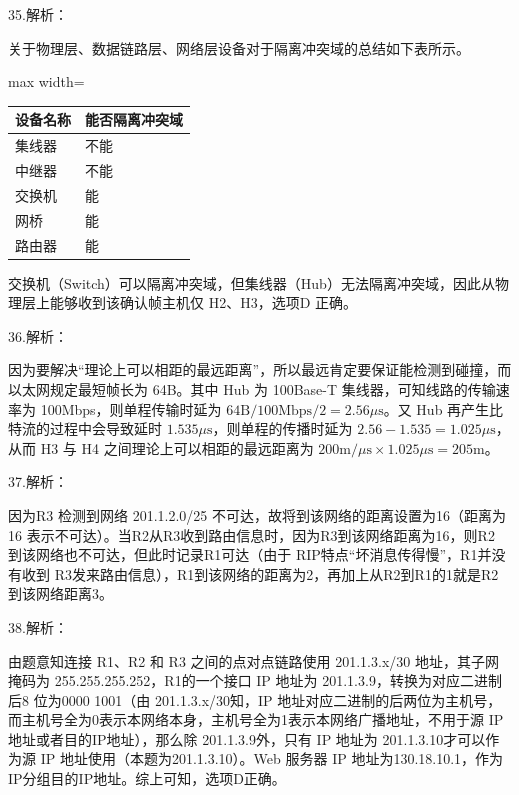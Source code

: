 \documentclass[UTF8,11pt]{ctexart}
\begin{document}
35.解析：


关于物理层、数据链路层、网络层设备对于隔离冲突域的总结如下表所示。


\begin{center}\begin{adjustbox}{max width=\linewidth}\begin{tabular}{|>{\raggedright\arraybackslash}p{\dimexpr(\linewidth-4\tabcolsep-3\arrayrulewidth)/2\relax}|>{\raggedright\arraybackslash}p{\dimexpr(\linewidth-4\tabcolsep-3\arrayrulewidth)/2\relax}|}\hline
设备名称 & 能否隔离冲突域\\\hline
集线器 & 不能\\\hline
中继器 & 不能\\\hline
交换机 & 能\\\hline
网桥 & 能\\\hline
路由器 & 能\\\hline\end{tabular}\end{adjustbox}\end{center}

交换机（Switch）可以隔离冲突域，但集线器（Hub）无法隔离冲突域，因此从物理层上能够收到该确认帧主机仅 H2、H3，选项D 正确。


36.解析：


因为要解决“理论上可以相距的最远距离”，所以最远肯定要保证能检测到碰撞，而以太网规定最短帧长为 64B。其中 Hub 为 100Base-T 集线器，可知线路的传输速率为 100Mbps，则单程传输时延为 \(\displaystyle 64\mathrm{B}/100\mathrm{Mbps}/2=2.56\mu\mathrm{s}\)。又 Hub 再产生比特流的过程中会导致延时 \(\displaystyle 1.535\mu\mathrm{s}\)，则单程的传播时延为 \(\displaystyle 2.56-1.535=1.025\mu\mathrm{s}\)，从而 H3 与 H4 之间理论上可以相距的最远距离为 \(\displaystyle 200\mathrm{m}/\mu\mathrm{s}\times1.025\mu\mathrm{s}=205\mathrm{m}\)。


37.解析：


因为R3 检测到网络 201.1.2.0/25 不可达，故将到该网络的距离设置为16（距离为16 表示不可达）。当R2从R3收到路由信息时，因为R3到该网络距离为16，则R2 到该网络也不可达，但此时记录R1可达（由于 RIP特点“坏消息传得慢”，R1并没有收到 R3发来路由信息），R1到该网络的距离为2，再加上从R2到R1的1就是R2到该网络距离3。


38.解析：


由题意知连接 R1、R2 和 R3 之间的点对点链路使用 201.1.3.x/30 地址，其子网掩码为 255.255.255.252，R1的一个接口 IP 地址为 201.1.3.9，转换为对应二进制后8 位为0000 1001（由 201.1.3.x/30知，IP 地址对应二进制的后两位为主机号，而主机号全为0表示本网络本身，主机号全为1表示本网络广播地址，不用于源 IP 地址或者目的IP地址），那么除 201.1.3.9外，只有 IP 地址为 201.1.3.10才可以作为源 IP 地址使用（本题为201.1.3.10）。Web 服务器 IP 地址为130.18.10.1，作为IP分组目的IP地址。综上可知，选项D正确。
\end{document}
